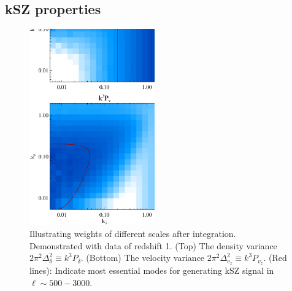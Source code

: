\documentclass[aps,prd,twocolumn,showpacs,superscriptaddress,groupedaddress,nofootinbib]{revtex4}  %
\begin{document}
\subsection{kSZ properties}
\begin{figure}[tbp]
\begin{center}
\includegraphics[width=0.48\textwidth]{figure/k3pd_k3pv_z1.eps}
\end{center}
\vspace{-0.7cm}
\caption{
    Illustrating weights of different scales after integration. 
    Demonstrated with data of redshift 1.
    (Top) The density variance $2\pi^2\Delta_\delta^2\equiv k^3P_\delta$. 
    (Bottom) The velocity variance $2\pi^2\Delta_{v_z}^2\equiv k^3P_{v_z}$. 
    (Red lines): Indicate most essential modes for generating kSZ signal in 
    $\ell\sim 500-3000$.
}
\label{fig:k3v}
\end{figure}
\end{document}
